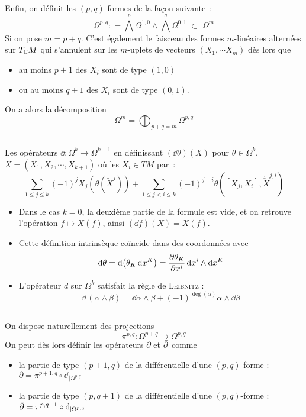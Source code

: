 \documentclass[a4paper,11pt,draft,makeidx,twocolumn]{amsart}
\begin{document}
\subsection{ \label{forme_type}} Enfin, on définit les $(p,q)$-formes de la façon suivante~:
\[
\Omega^{p,q} : = \bigwedge^p \Omega^{1,0}  \wedge \bigwedge^q \Omega^{0,1} \; \subset \; \Omega^m
\]
Si on pose $m=p+q$. C'est également le faisceau des formes $m$-linéaires alternées sur $T_{\mathbb{C}} M$ qui s'annulent sur les $m$-uplets de vecteurs $(X_1,\cdots X_{m})$ dès lors que
\begin{itemize}
\item au moins $p+1$ des $X_i$ sont de type $(1,0)$
\item ou au moins $q+1$ des $X_i$ sont de type $(0,1)$.
\end{itemize}
On a alors la décomposition
\[
\Omega^m = \bigoplus_{p+q = m} \Omega^{p,q}
\]
\subsection{} Les opérateurs $\dd : \Omega^k \rightarrow \Omega^{k+1}$ en définissant $(\dd \theta)(X)$ pour $\theta \in  \Omega^k$, $X=(X_1,X_2, \cdots , X_{k+1})$ où les $X_i \in TM$ par~:
\[
\sum_{1 \leq j \leq k} (−1)^j X_j\left(\theta\left(\check{X}^j\right)\right)+
\sum_{1 \leq j < i \leq k} (−1)^{j+i} \theta\left([X_j,X_i ], \check{\check{X}}^{j,i} \right)
\]
\begin{itemize}
\item Dans le cas $k=0$, la deuxième partie de la formule est vide, et on retrouve l’opération $f \mapsto X(f)$, ainsi $(\dd f)(X) = X(f)$.
\item Cette définition intrinsèque coïncide dans des coordonnées avec
\[
\operatorname{d\!} \theta = \operatorname{d\!} \left(\theta_K \operatorname{d\!} x^K\right) = \dfrac{\partial{\theta_K}}{\partial{x^i}}\operatorname{d\!} x^i \wedge \operatorname{d\!} x^K
\]
\item L’opérateur $d$ sur $ \Omega^k$ satisfait la règle de \textsc{Leibnitz} : 
\[
\dd\,(\alpha \wedge \beta) = \dd \alpha \wedge \beta +(-1)^{\deg(\alpha)} \alpha \wedge \dd \beta
\]
\end{itemize}
\subsection{} On dispose naturellement des projections
\[
\pi^{p,q} : \Omega^{p+q} \longrightarrow \Omega^{p,q}
\]
On peut dès lors définir les opérateurs $\partial$ et $\operatorname{\bar{\partial}}$ comme
\begin{itemize}
\item la partie de type $(p+1,q)$ de la différentielle d'une $(p,q)$-forme : $\partial = \pi^{p+1,q} \circ \dd_{\,\vert \Omega^{p,q}}$
\item la partie de type $(p,q+1)$ de la différentielle d'une $(p,q)$-forme : $\operatorname{\bar{\partial}} = \pi^{p,q+1} \circ \operatorname{d\!}_{\,\vert \Omega^{p,q}}$
\end{itemize}
\end{document}
